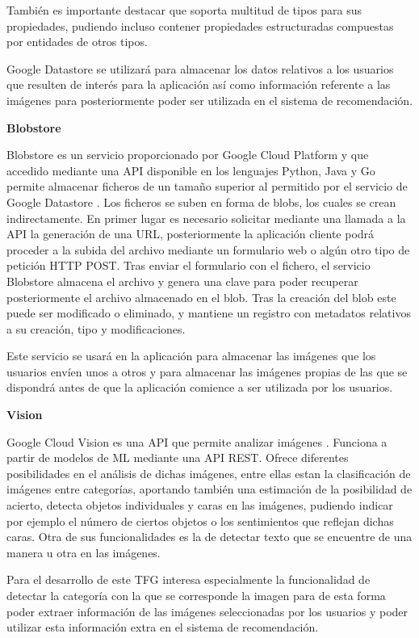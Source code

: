 También es importante destacar que soporta multitud de tipos para sus propiedades, pudiendo incluso contener propiedades estructuradas compuestas por entidades de otros tipos.

Google Datastore se utilizará para almacenar los datos relativos a los usuarios que resulten de interés para la aplicación así como información referente a las imágenes para posteriormente poder ser utilizada en el sistema de recomendación.


\textbf{Blobstore}

Blobstore es un servicio proporcionado por Google Cloud Platform y que accedido mediante una \acs{API} disponible en los lenguajes Python, Java y Go permite almacenar ficheros de un tamaño superior al permitido por el servicio de Google Datastore \cite{Blobstore}. Los ficheros se suben en forma de blobs, los cuales se crean indirectamente. En primer lugar  es necesario solicitar mediante una llamada a la \acs{API} la generación de una \acs{URL}, posteriormente la aplicación cliente podrá proceder a la subida del archivo mediante un formulario web o algún otro tipo de petición \acs{HTTP} POST. Tras enviar el formulario con el fichero, el servicio Blobstore almacena el archivo y genera una clave para poder recuperar posteriormente el archivo almacenado en el blob. Tras la creación del blob este puede ser modificado o eliminado, y mantiene un registro con metadatos relativos a su creación, tipo y modificaciones.

Este servicio se usará en la aplicación para almacenar las imágenes que los usuarios envíen unos a otros y para almacenar las imágenes propias de las que se dispondrá antes de que la aplicación comience a ser utilizada por los usuarios.

\textbf{Vision}

Google Cloud Vision es una \acs{API} que permite analizar imágenes \cite{Vision}. Funciona a partir de modelos de \acf{ML} mediante una \acs{API} \acs{REST}. Ofrece diferentes posibilidades en el análisis de dichas imágenes, entre ellas estan la clasificación de imágenes entre categorías, aportando también una estimación de la posibilidad de acierto, detecta objetos individuales y caras en las imágenes, pudiendo indicar por ejemplo el número de ciertos objetos o los sentimientos que reflejan dichas caras. Otra de sus funcionalidades es la de detectar texto que se encuentre de una manera u otra en las imágenes.

Para el desarrollo de este \ac{TFG} interesa especialmente la funcionalidad de detectar la categoría con la que se corresponde la imagen para de esta forma poder extraer información de las imágenes seleccionadas por los usuarios y poder utilizar esta información extra en el sistema de recomendación.



